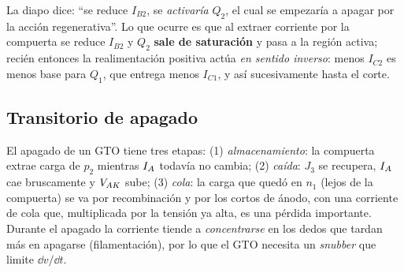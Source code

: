 \begin{ojo}
La diapo dice: ``se reduce $I_{B2}$, se \emph{activaría} $Q_2$, el cual se empezaría a apagar por la
acción regenerativa''. Lo que ocurre es que al extraer corriente por la compuerta se reduce $I_{B2}$
y $Q_2$ \textbf{sale de saturación} y pasa a la región activa; recién entonces la realimentación
positiva actúa \emph{en sentido inverso}: menos $I_{C2}$ es menos base para $Q_1$, que entrega menos
$I_{C1}$, y así sucesivamente hasta el corte.
\end{ojo}

\subsection{Transitorio de apagado}

El apagado de un GTO tiene tres etapas: (1) \emph{almacenamiento}: la compuerta extrae carga de $p_2$
mientras $I_{A}$ todavía no cambia; (2) \emph{caída}: $J_3$ se recupera, $I_{A}$ cae bruscamente y
$V_{AK}$ sube; (3) \emph{cola}: la carga que quedó en $n_1$ (lejos de la compuerta) se va por
recombinación y por los cortos de ánodo, con una corriente de cola que, multiplicada por la tensión
ya alta, es una pérdida importante. Durante el apagado la corriente tiende a \emph{concentrarse} en
los dedos que tardan más en apagarse (filamentación), por lo que el GTO necesita un \emph{snubber}
que limite $\dd v/\dd t$.
